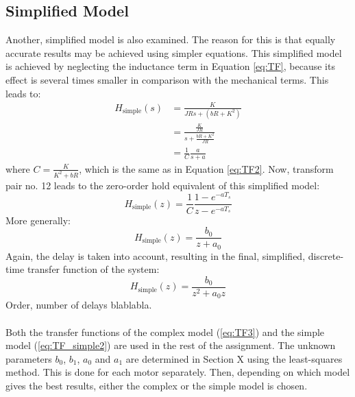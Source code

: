 \documentclass[a4paper,kul]{kulakarticle} %
\begin{document}
\subsection{Simplified Model}
Another, simplified model is also examined. The reason for this is that equally accurate results may be achieved using simpler equations. This simplified model is achieved by neglecting the inductance term in Equation \ref{eq:TF}, because its effect is several times smaller in comparison with the mechanical terms. This leads to:
\begin{equation}
\label{eq:TF_simple}
	\begin{split}
	H_{\text{simple}}(s) &= \frac{K}{JRs + (bR + K^2)} \\
	&= \frac{\frac{K}{JR}}{s + \frac{bR + K^2}{JR}} \\
	&= \frac{1}{C}\frac{a}{s + a}
	\end{split}
\end{equation}
where $C = \frac{K}{K^2 + bR}$, which is the same as in Equation \ref{eq:TF2}. Now, transform pair no. 12 leads to the zero-order hold equivalent of this simplified model:
\begin{equation}
	H_{\text{simple}}(z) = \frac{1}{C}\frac{1-e^{-aT_s}}{z-e^{-aT_s}}
\end{equation}
More generally:
\begin{equation}
	H_{\text{simple}}(z) = \frac{b_0}{z + a_0}
\end{equation}
Again, the delay is taken into account, resulting in the final, simplified, discrete-time transfer function of the system:
\begin{equation}
\label{eq:TF_simple2}
	H_{\text{simple}}(z) = \frac{b_0}{z^2 + a_0 z}
\end{equation}
Order, number of delays blablabla. 
\\\\
Both the transfer functions of the complex model (\ref{eq:TF3}) and the simple model (\ref{eq:TF_simple2}) are used in the rest of the assignment. The unknown parameters $b_0$, $b_1$, $a_0$ and $a_1$ are determined in Section X using the least-squares method. This is done for each motor separately. Then, depending on which model gives the best results, either the complex or the simple model is chosen.





\end{document}
